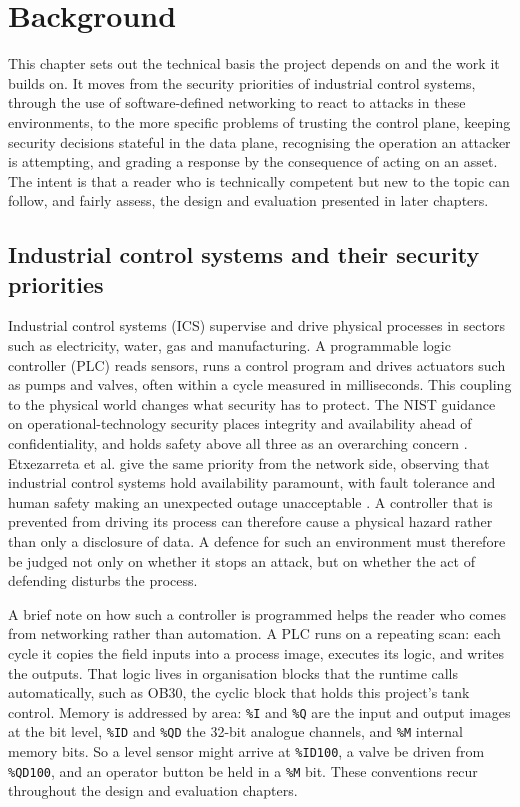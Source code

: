\chapter{Background}
\label{chap:background}

\noindent
This chapter sets out the technical basis the project depends on and the work it builds on. It moves from the security priorities of industrial control systems, through the use of software-defined networking to react to attacks in these environments, to the more specific problems of trusting the control plane, keeping security decisions stateful in the data plane, recognising the operation an attacker is attempting, and grading a response by the consequence of acting on an asset. The intent is that a reader who is technically competent but new to the topic can follow, and fairly assess, the design and evaluation presented in later chapters.

\section{Industrial control systems and their security priorities}
\label{sec:ics}

Industrial control systems (ICS) supervise and drive physical processes in sectors such as electricity, water, gas and manufacturing. A programmable logic controller (PLC) reads sensors, runs a control program and drives actuators such as pumps and valves, often within a cycle measured in milliseconds. This coupling to the physical world changes what security has to protect. The NIST guidance on operational-technology security places integrity and availability ahead of confidentiality, and holds safety above all three as an overarching concern \cite{nist80082}. Etxezarreta et al. give the same priority from the network side, observing that industrial control systems hold availability paramount, with fault tolerance and human safety making an unexpected outage unacceptable \cite{etxezarreta2023survey}. A controller that is prevented from driving its process can therefore cause a physical hazard rather than only a disclosure of data. A defence for such an environment must therefore be judged not only on whether it stops an attack, but on whether the act of defending disturbs the process.

A brief note on how such a controller is programmed helps the reader who comes from networking rather than automation. A PLC runs on a repeating scan: each cycle it copies the field inputs into a process image, executes its logic, and writes the outputs. That logic lives in organisation blocks that the runtime calls automatically, such as OB30, the cyclic block that holds this project's tank control. Memory is addressed by area: \texttt{\%I} and \texttt{\%Q} are the input and output images at the bit level, \texttt{\%ID} and \texttt{\%QD} the 32-bit analogue channels, and \texttt{\%M} internal memory bits. So a level sensor might arrive at \texttt{\%ID100}, a valve be driven from \texttt{\%QD100}, and an operator button be held in a \texttt{\%M} bit. These conventions recur throughout the design and evaluation chapters.

